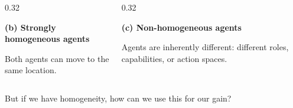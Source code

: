 \begin{frame}
\begin{columns}[T,onlytextwidth]
\begin{column}{0.32\textwidth}
\vspace{0.3em}
\begin{minipage}[t][1.9cm][t]{\linewidth}
\centering
\small
\textbf{(b) Strongly homogeneous agents}

\vspace{0.3em}
Both agents can move to the same location.
\end{minipage}

\end{column}
\hfill
\begin{column}{0.32\textwidth}
\centering


\vspace{0.3em}
\begin{minipage}[t][1.9cm][t]{\linewidth}
\centering
\small
\textbf{(c) Non-homogeneous agents}

\vspace{0.3em}
Agents are inherently different: different roles, capabilities, or action spaces.
\end{minipage}

\end{column}

\end{columns}

\centering
But if we have homogeneity, how can we use this for our gain?

\end{frame}


